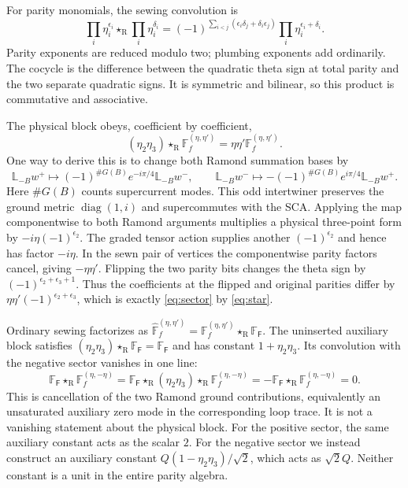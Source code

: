 \documentclass[11pt]{article}
\newcommand{\R}{\mathrm{R}}
\newcommand{\FF}{\mathbb F}
\newcommand{\hFF}{\widehat{\mathbb F}}
\newcommand{\st}{\star_{\R}}
\numberwithin{equation}{section}
\begin{document}
For parity monomials, the sewing convolution is
\begin{equation}
 \prod_i\eta_i^{\epsilon_i}\st\prod_i\eta_i^{\delta_i}
 =(-1)^{\sum_{i<j}(\epsilon_i\delta_j+\delta_i\epsilon_j)}
 \prod_i\eta_i^{\epsilon_i+\delta_i}.
 \label{eq:star}
\end{equation}
Parity exponents are reduced modulo two; plumbing exponents add ordinarily.
The cocycle is the difference between the quadratic theta sign at total
parity and the two separate quadratic signs. It is symmetric and bilinear,
so this product is commutative and associative.

The physical block obeys, coefficient by coefficient,
\begin{equation}
 (\eta_2\eta_3)\st\FF_f^{(\eta,\eta')}
 =\eta\eta'\FF_f^{(\eta,\eta')}.
 \label{eq:sector}
\end{equation}
One way to derive this is to change both Ramond summation bases by
\begin{equation}
 \mathbb L_{-B}w^+\mapsto(-1)^{\#G(B)}e^{-i\pi/4}\mathbb L_{-B}w^-,
 \qquad
 \mathbb L_{-B}w^-\mapsto-(-1)^{\#G(B)}e^{i\pi/4}\mathbb L_{-B}w^+.
 \label{eq:physical-intertwiner}
\end{equation}
Here $\#G(B)$ counts supercurrent modes. This odd intertwiner preserves the
ground metric $\operatorname{diag}(1,i)$ and supercommutes with the SCA.
Applying the map componentwise to both Ramond arguments multiplies a physical
three-point form by $-i\eta(-1)^{\epsilon_2}$.
The graded tensor action supplies another $(-1)^{\epsilon_2}$ and hence
has factor $-i\eta$. In the sewn pair of vertices the componentwise parity
factors cancel, giving $-\eta\eta'$.
Flipping the two parity bits changes the theta sign by
$(-1)^{\epsilon_2+\epsilon_3+1}$. Thus the coefficients at the flipped
and original parities differ by $\eta\eta'(-1)^{\epsilon_2+\epsilon_3}$,
which is exactly \eqref{eq:sector} by \eqref{eq:star}.

Ordinary sewing factorizes as
$\hFF_f^{(\eta,\eta')}=\FF_f^{(\eta,\eta')}\st\FF_{\mathsf F}$.
The uninserted auxiliary block satisfies
$(\eta_2\eta_3)\st\FF_{\mathsf F}=\FF_{\mathsf F}$ and has constant
$1+\eta_2\eta_3$. Its convolution with the negative sector vanishes in one line:
\begin{equation}
 \FF_{\mathsf F}\st\FF_f^{(\eta,-\eta)}
 =\FF_{\mathsf F}\st(\eta_2\eta_3)\st\FF_f^{(\eta,-\eta)}
 =-\FF_{\mathsf F}\st\FF_f^{(\eta,-\eta)}=0.
 \label{eq:cancellation}
\end{equation}
This is cancellation of the two Ramond ground contributions, equivalently
an unsaturated auxiliary zero mode in the corresponding loop trace. It is
not a vanishing statement about the physical block.
For the positive sector, the same auxiliary constant acts as the scalar $2$.
For the negative sector we instead construct an auxiliary constant
$Q(1-\eta_2\eta_3)/\sqrt2$, which acts as $\sqrt2Q$.
Neither constant is a unit in the entire parity algebra.
\end{document}
